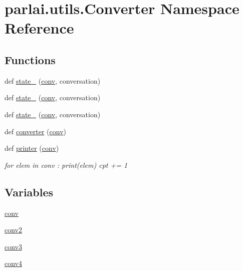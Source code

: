 \hypertarget{namespaceparlai_1_1utils_1_1Converter}{}\section{parlai.\+utils.\+Converter Namespace Reference}
\label{namespaceparlai_1_1utils_1_1Converter}
\subsection*{Functions}
\begin{DoxyCompactItemize}
\item 
def \hyperlink{namespaceparlai_1_1utils_1_1Converter_a70095b67e171470e875dd9812d53fbc5}{state\+\_} (\hyperlink{namespaceparlai_1_1utils_1_1Converter_a2e942515aeaa70796cb716cd2f5be7ce}{conv}, conversation)
\item 
def \hyperlink{namespaceparlai_1_1utils_1_1Converter_a6e544c13c3304bc8e97127997e507bb3}{state\+\_} (\hyperlink{namespaceparlai_1_1utils_1_1Converter_a2e942515aeaa70796cb716cd2f5be7ce}{conv}, conversation)
\item 
def \hyperlink{namespaceparlai_1_1utils_1_1Converter_a051af07ed1e796ee044390b710646091}{state\+\_} (\hyperlink{namespaceparlai_1_1utils_1_1Converter_a2e942515aeaa70796cb716cd2f5be7ce}{conv}, conversation)
\item 
def \hyperlink{namespaceparlai_1_1utils_1_1Converter_abd079f987382596057ec8c630fa3db8c}{converter} (\hyperlink{namespaceparlai_1_1utils_1_1Converter_a2e942515aeaa70796cb716cd2f5be7ce}{conv})
\item 
def \hyperlink{namespaceparlai_1_1utils_1_1Converter_a2ef9c241b22f84ea3a4123efd90f29b6}{printer} (\hyperlink{namespaceparlai_1_1utils_1_1Converter_a2e942515aeaa70796cb716cd2f5be7ce}{conv})
\begin{DoxyCompactList}\small\item\em for elem in conv \+: print(elem) cpt += 1 \end{DoxyCompactList}\end{DoxyCompactItemize}
\subsection*{Variables}
\begin{DoxyCompactItemize}
\item 
\hyperlink{namespaceparlai_1_1utils_1_1Converter_a2e942515aeaa70796cb716cd2f5be7ce}{conv}
\item 
\hyperlink{namespaceparlai_1_1utils_1_1Converter_aac04ea3fc65825d573bf7fe3a8debae7}{conv2}
\item 
\hyperlink{namespaceparlai_1_1utils_1_1Converter_a86b1dac766cc216e05c59dea2eb09327}{conv3}
\item 
\hyperlink{namespaceparlai_1_1utils_1_1Converter_a9e6bb510b21ba85966a1f204e2f71a0e}{conv4}
\end{DoxyCompactItemize}


